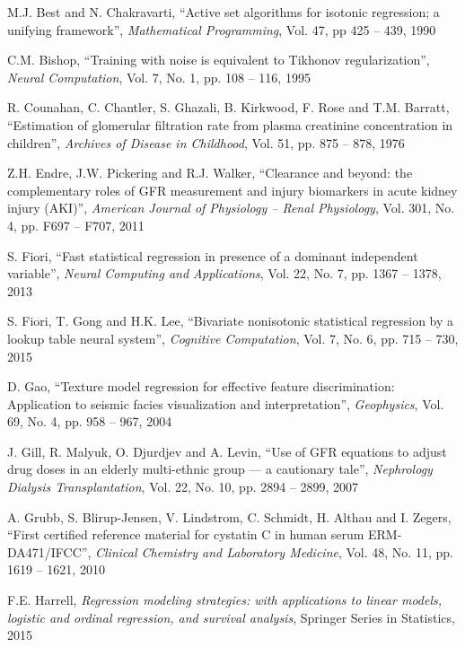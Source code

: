 \documentclass[10pt,final]{siamltex}
\begin{document}
\begin{thebibliography}{99}
   M.J. Best and N. Chakravarti, ``Active set algorithms for isotonic regression; a unifying framework'', \textit{Mathematical Programming}, Vol. 47, pp 425 -- 439, 1990

   C.M. Bishop, ``Training with noise is equivalent to Tikhonov regularization'', \textit{Neural Computation}, Vol. 7, No. 1, pp. 108 -- 116, 1995

 R. Counahan, C. Chantler, S. Ghazali, B. Kirkwood, F. Rose and T.M. Barratt, ``Estimation of glomerular filtration rate from plasma creatinine concentration in children'', \textit{Archives of Disease in Childhood},  Vol. 51, pp. 875 -- 878, 1976

   Z.H. Endre, J.W. Pickering and R.J. Walker, ``Clearance and beyond: the complementary roles of GFR measurement and injury biomarkers in acute kidney injury (AKI)'', \textit{American Journal of Physiology -- Renal Physiology}, Vol. 301, No. 4, pp. F697 -- F707, 2011

   S. Fiori, ``Fast statistical regression in presence of a dominant independent variable'', \textit{Neural Computing and Applications}, Vol. 22, No. 7, pp. 1367 -- 1378, 2013

   S. Fiori, T. Gong and H.K. Lee, ``Bivariate nonisotonic statistical regression by a lookup table neural system'', \textit{Cognitive Computation}, Vol. 7, No. 6, pp. 715 -- 730, 2015

   D. Gao, ``Texture model regression for effective feature discrimination: Application to seismic facies visualization and interpretation'', \textit{Geophysics}, Vol. 69, No. 4, pp. 958 -- 967, 2004

   J. Gill, R. Malyuk, O. Djurdjev and A. Levin, ``Use of GFR equations to adjust drug doses in an elderly multi-ethnic group --- a cautionary tale'', \textit{Nephrology Dialysis Transplantation}, Vol. 22, No. 10, pp. 2894 -- 2899, 2007

   A. Grubb, S. Blirup-Jensen, V. Lindstrom, C. Schmidt, H. Althau and I. Zegers, ``First certified reference material for cystatin C in human serum ERM-DA471/IFCC'', \textit{Clinical Chemistry and Laboratory Medicine}, Vol. 48, No. 11, pp. 1619 -- 1621, 2010

   F.E. Harrell, \textit{Regression modeling strategies: with applications to linear models, logistic and ordinal regression, and survival analysis}, Springer Series in Statistics, 2015


\end{thebibliography}
\end{document}
